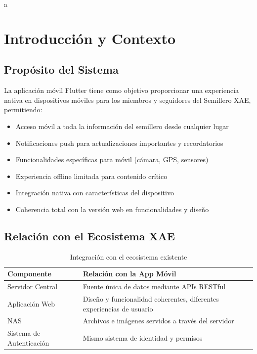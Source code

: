 \documentclass[12pt]{article}
\begin{document}
\begin{abstract}
Especificación técnica completa para el desarrollo de una aplicación móvil multiplataforma (Android/iOS) utilizando Flutter que consumirá los endpoints del Servidor Central Modular del Semillero XAE. La aplicación mantendrá coherencia visual y funcional con la versión web, implementando la misma estética industrial de los años 80 con arquitectura modular optimizada para dispositivos móviles.
\end{abstract}a

\section{Introducción y Contexto}
\label{sec:introduccion}

\subsection{Propósito del Sistema}
La aplicación móvil Flutter tiene como objetivo proporcionar una experiencia nativa en dispositivos móviles para los miembros y seguidores del Semillero XAE, permitiendo:

\begin{itemize}
    \item Acceso móvil a toda la información del semillero desde cualquier lugar
    \item Notificaciones push para actualizaciones importantes y recordatorios
    \item Funcionalidades específicas para móvil (cámara, GPS, sensores)
    \item Experiencia offline limitada para contenido crítico
    \item Integración nativa con características del dispositivo
    \item Coherencia total con la versión web en funcionalidades y diseño
\end{itemize}

\subsection{Relación con el Ecosistema XAE}
\begin{table}[H]
\centering
\begin{tabularx}{\textwidth}{|l|X|}
\hline
\textbf{Componente} & \textbf{Relación con la App Móvil} \\
\hline
Servidor Central & Fuente única de datos mediante APIs RESTful \\
\hline
Aplicación Web & Diseño y funcionalidad coherentes, diferentes experiencias de usuario \\
\hline
NAS & Archivos e imágenes servidos a través del servidor \\
\hline
Sistema de Autenticación & Mismo sistema de identidad y permisos \\
\hline
\end{tabularx}
\caption{Integración con el ecosistema existente}
\end{table}
\end{document}

